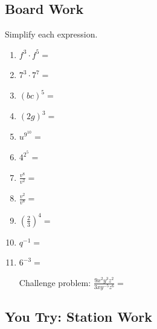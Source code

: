 \documentclass[12pt]{article}
\begin{document}
\pagebreak



\subsection*{Board Work}

Simplify each expression.\\

\begin{enumerate}

	\item $f^3 \cdot f^5=$\\
	
	\item $7^3 \cdot 7^7=$\\
	
	\item $(bc)^5=$\\
	
	\item $(2g)^3=$\\
	
	\item $u^{9^{10}}=$\\
	
	\item $ 4^{2^5}=$\\
	
	\item $\frac{v^8}{v^2}=$\\
	
	\item $\frac{v^2}{v^8}=$\\
	
	\item $\left(\frac{2}{3}\right)^4=$\\
	
	\item $q^{-1}=$\\
	
	\item $6^{-3}=$\\
	
	\vspace{1cm}
	
	Challenge problem: $\frac{9x^2y^3z^{2}}{3xy^{-5}z^{6}}=$\\

\end{enumerate}	
	
\pagebreak

\subsection*{You Try: Station Work}
\end{document}
